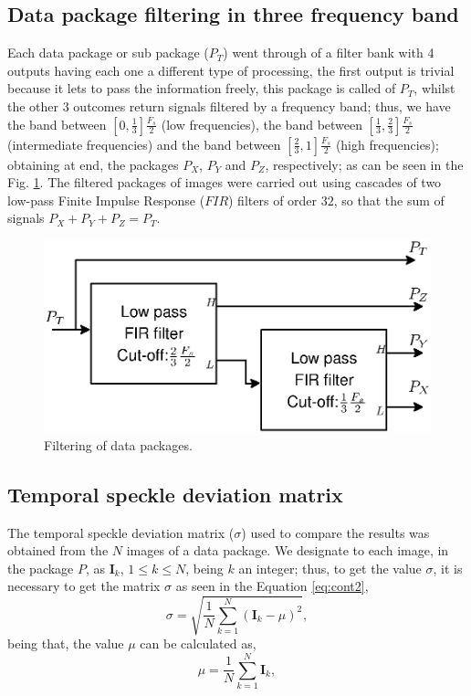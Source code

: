 \documentclass[review]{elsarticle}
\begin{document}
\subsection{Data package filtering in three frequency band}
\label{subsec:firfilters}
Each data package or sub package ($P_T$) went through of a filter bank with 4 outputs  having each
one a different type of processing, the first output is trivial because it
lets to pass the information freely, this package is called of $P_T$, whilst the other 3 outcomes
return  signals filtered by a frequency band; thus, 
we have the band between $[0,\frac{1}{3}]\frac{F_s}{2}$ (low frequencies),
the band between $[\frac{1}{3},\frac{2}{3}]\frac{F_s}{2}$ (intermediate frequencies) and
the band between $[\frac{2}{3},1]\frac{F_s}{2}$ (high frequencies); obtaining at end, the packages 
$P_X$, $P_Y$ and $P_Z$, respectively; as can be seen in the  Fig. \ref{fig:firfilters}.
The filtered packages of images were carried out using cascades
of two low-pass Finite Impulse Response ($FIR$) filters of order $32$, so that
the sum of signals $P_X+P_Y+P_Z=P_T$.
\begin{figure}[h!]
\centering
\includegraphics[width=0.55\columnwidth]{firfilters.eps}
\caption{Filtering of data packages.}
\label{fig:firfilters}
\end{figure}



\subsection{Temporal speckle deviation matrix}
\label{subsec:deviation}
The temporal speckle deviation matrix ($\sigma$) \cite{Nothdurft:05} 
used to compare the results was obtained from the $N$ images of a data package.
We designate to each image, in the package $P$, as $\mathbf{I}_{k}$, $1\leq k \leq N$, being $k$ an integer;
thus, to get the value $\sigma$, 
 it is necessary to get 
the matrix $\sigma$ as seen in the Equation \ref{eq:cont2}, 
\begin{equation}\label{eq:cont2}
\sigma  = \sqrt{ \frac{1}{N} \sum_{k=1}^{N} (\mathbf{I}_{k}-\mu)^2  },
\end{equation}
being that, the value $\mu$ can be calculated as, 
\begin{equation}\label{eq:cont1}
\mu =  \frac{1}{N} \sum_{k=1}^{N} \mathbf{I}_{k},
\end{equation}
\end{document}
